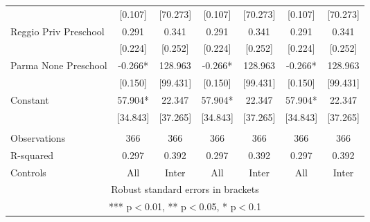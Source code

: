 \begin{tabular}{lcccccc}
 & [0.107] & [70.273] & [0.107] & [70.273] & [0.107] & [70.273] \\
Reggio Priv Preschool & 0.291 & 0.341 & 0.291 & 0.341 & 0.291 & 0.341 \\
 & [0.224] & [0.252] & [0.224] & [0.252] & [0.224] & [0.252] \\
Parma None Preschool & -0.266* & 128.963 & -0.266* & 128.963 & -0.266* & 128.963 \\
 & [0.150] & [99.431] & [0.150] & [99.431] & [0.150] & [99.431] \\
Constant & 57.904* & 22.347 & 57.904* & 22.347 & 57.904* & 22.347 \\
 & [34.843] & [37.265] & [34.843] & [37.265] & [34.843] & [37.265] \\
 &  &  &  &  &  &  \\
Observations & 366 & 366 & 366 & 366 & 366 & 366 \\
R-squared & 0.297 & 0.392 & 0.297 & 0.392 & 0.297 & 0.392 \\
 Controls & All & Inter & All & Inter & All & Inter \\ \hline
\multicolumn{7}{c}{ Robust standard errors in brackets} \\
\multicolumn{7}{c}{ *** p$<$0.01, ** p$<$0.05, * p$<$0.1} \\
\end{tabular}
